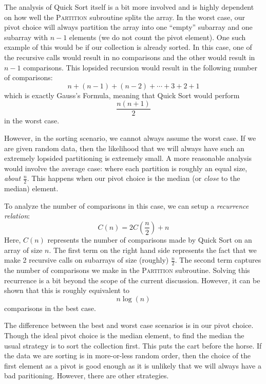 The analysis of Quick Sort itself is a bit more involved and is highly
dependent on how well the \textsc{Partition} subroutine splits the
array.  In the worst case, our pivot choice will always partition the
array into one ``empty'' subarray and one subarray with $n-1$ elements
(we do not count the pivot element).  One such example of this would
be if our collection is already sorted.  In this case, one of the
recursive calls would result in no comparisons and the other would result
in $n-1$ comparisons.  This lopsided recursion would result in the
following number of comparisons:
$$n + (n-1) + (n-2) + \cdots + 3 + 2 + 1$$
which is exactly Gauss's Formula, meaning that Quick Sort would perform
$$\frac{n(n+1)}{2}$$
in the worst case.

However, in the sorting scenario, we cannot always assume the worst case.
If we are given random data, then the likelihood that we will always have
such an extremely lopsided partitioning is extremely small.  A more reasonable
analysis would involve the average case: where each partition is roughly an
equal size, \emph{about} $\frac{n}{2}$.  This happens when our pivot
choice is the median (or \emph{close} to the median) element.

To analyze the number of comparisons in this case, we can setup a 
\emph{recurrence relation}:
  $$C(n) = 2C\left( \frac{n}{2} \right) + n$$
Here, $C(n)$ represents the number of comparisons made by Quick Sort
on an array of size $n$.  The first term on the right hand side represents
the fact that we make 2 recursive calls on subarrays of size (roughly)
$\frac{n}{2}$.  The second term captures the number of comparisons we
make in the \textsc{Partition} subroutine.  Solving this recurrence is
a bit beyond the scope of the current discussion.  However, it can be
shown that this is roughly equivalent to 
  $$n\log{(n)}$$
comparisons in the best case.  

The difference between the best and worst case scenarios is in our pivot
choice.  Though the ideal pivot choice is the median element,
to find the median the usual strategy is to sort the collection first. 
This puts the cart before the horse.  If the data we are sorting is
in more-or-less random order, then the choice of the first element as a
pivot is good enough as it is unlikely that we will always have a 
bad paritioning.  However, there are other strategies.

